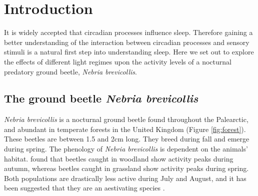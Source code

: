 \section{Introduction} \label{intro}
It is widely accepted that circadian processes influence sleep. Therefore gaining a better understanding of the interaction between circadian processes and sensory stimuli is a natural first step into understanding sleep. Here we set out to explore the effects of different light regimes upon the activity levels of a nocturnal predatory ground beetle, \textit{Nebria brevicollis}.

\subsection{The ground beetle \textit{Nebria brevicollis}}
\textit{Nebria brevicollis} is a nocturnal ground beetle found throughout the Palearctic, and abundant in temperate forests in the United Kingdom (Figure \ref{fig:forest}). These beetles are between 1.5 and 2cm long. They breed during fall and emerge during spring. The phenology of \textit{Nebria brevicollis} is dependent on the  animals' habitat. \cite{Williams1959} found that beetles caught in woodland show activity peaks during autumn, whereas beetles caught in grassland show activity peaks during spring. Both populations are drastically less active during July and August, and it has been suggested that they are an aestivating species \citep{Pozsgai2018}. 

